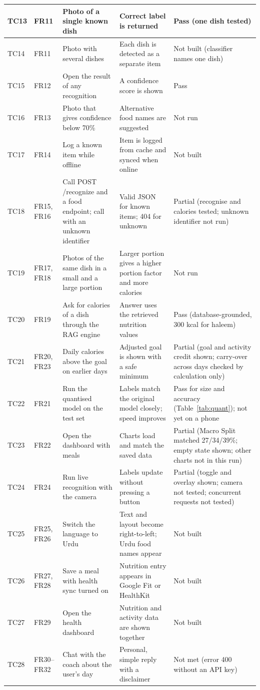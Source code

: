\begin{longtable}{|l|l|>{\raggedright\arraybackslash}p{3.7cm}|>{\raggedright\arraybackslash}p{3.2cm}|>{\raggedright\arraybackslash}p{2.6cm}|}
TC13 & FR11 & Photo of a single known dish & Correct label is returned & Pass (one dish tested) \\ \hline
TC14 & FR11 & Photo with several dishes & Each dish is detected as a separate item & Not built (classifier names one dish) \\ \hline
TC15 & FR12 & Open the result of any recognition & A confidence score is shown & Pass \\ \hline
TC16 & FR13 & Photo that gives confidence below 70\% & Alternative food names are suggested & Not run \\ \hline
TC17 & FR14 & Log a known item while offline & Item is logged from cache and synced when online & Not built \\ \hline
TC18 & FR15, FR16 & Call POST /recognize and a food endpoint; call with an unknown identifier & Valid JSON for known items; 404 for unknown & Partial (recognise and calories tested; unknown identifier not run) \\ \hline
TC19 & FR17, FR18 & Photos of the same dish in a small and a large portion & Larger portion gives a higher portion factor and more calories & Not run \\ \hline
TC20 & FR19 & Ask for calories of a dish through the RAG engine & Answer uses the retrieved nutrition values & Pass (database-grounded, 300 kcal for haleem) \\ \hline
TC21 & FR20, FR23 & Daily calories above the goal on earlier days & Adjusted goal is shown with a safe minimum & Partial (goal and activity credit shown; carry-over across days checked by calculation only) \\ \hline
TC22 & FR21 & Run the quantised model on the test set & Labels match the original model closely; speed improves & Pass for size and accuracy (Table~\ref{tab:quant}); not yet on a phone \\ \hline
TC23 & FR22 & Open the dashboard with meals & Charts load and match the saved data & Partial (Macro Split matched 27/34/39\%; empty state shown; other charts not in this run) \\ \hline
TC24 & FR24 & Run live recognition with the camera & Labels update without pressing a button & Partial (toggle and overlay shown; camera not tested; concurrent requests not tested) \\ \hline
TC25 & FR25, FR26 & Switch the language to Urdu & Text and layout become right-to-left; Urdu food names appear & Not built \\ \hline
TC26 & FR27, FR28 & Save a meal with health sync turned on & Nutrition entry appears in Google Fit or HealthKit & Not built \\ \hline
TC27 & FR29 & Open the health dashboard & Nutrition and activity data are shown together & Not built \\ \hline
TC28 & FR30--FR32 & Chat with the coach about the user's day & Personal, simple reply with a disclaimer & Not met (error 400 without an API key) \\ \hline
\end{longtable}

